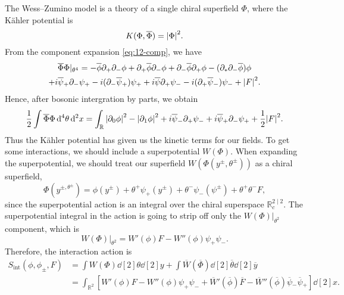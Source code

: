The Wess--Zumino model is a theory of a single chiral superfield $\Phi$, where the Kähler potential is 
\begin{equation}
  K(\Phi, \overline{\Phi}{}) = \abs{\Phi}^2.
\end{equation}
From the component expansion \eqref{eq:12-comp}, we have
\begin{multline}
  \overline{\Phi}{} \Phi\rvert_{\theta^4} = - \overline{\phi}{} \partial_+ \partial_- \phi + \partial_+ \overline{\phi}{} \partial_- \phi + \partial_- \overline{\phi}{} \partial_+ \phi - (\partial_* \partial_- \overline{\phi}{}) \phi \\
  + i \overline{\psi}{}_+ \partial_- \psi_+ - i (\partial_- \overline{\psi}{}_+) \psi_+ + i \overline{\psi}{} \partial_+ \psi_- - i (\partial_+ \overline{\psi}{}_-) \psi_- + \abs{F}^2.
\end{multline}
Hence, after bosonic intergration by parts, we obtain
\begin{equation}
  \frac{1}{2} \int \overline{\Phi}{} \Phi \dd[4]{\theta} \dd[2]{x} = \int_\mathbb{R} \abs{\partial_0 \phi}^2 - \abs{\partial_1 \phi}^2 + i \overline{\psi}{}_- \partial_+ \psi_- + i \overline{\psi}{}_+ \partial_- \psi_+ + \frac{1}{2} \abs{F}^2.
\end{equation}
Thus the Kähler potential has given us the kinetic terms for our fields. To get some interactions, we should include a superpotential $W(\Phi)$.
When expanding the superpotential, we should treat our superfield $W(\Phi (y^{\pm}, \theta^{\pm}))$ as a chiral superfield,
\begin{equation}
  \Phi(y^{\pm, \theta^{\pm}}) = \phi(y^{\pm}) + \theta^+ \psi_+ (y^{\pm}) + \theta^- \psi_- (\psi^{\pm}) + \theta ^+ \theta^- F,
\end{equation}
since the superpotential action is an integral over the chiral superspace $\mathbb{R}_c^{2 \mid 2}$.
The superpotential integral in the action is going to strip off only the $W(\Phi) \rvert_{\theta^2}$ component, which is
\begin{equation}
  W(\Phi) \rvert_{\theta^2} = W'(\phi) F - W'' (\phi) \psi_+ \psi_-.
\end{equation}
Therefore, the interaction action is
\begin{align}
  S_{\text{int}} (\phi, \phi_{\pm}, F) &= \int W(\Phi) \dd[2]{\theta} \dd[2]{y} + \int \overline{W} (\overline{\Phi}{}) \dd[2]{\overline{\theta}{}} \dd[2]{\overline{y}{}} \\
				       &= \int_{\mathbb{R}^2} \left[ W'(\phi) F - W''(\phi) \psi_+ \psi_- + \overline{W}{}' (\overline{\phi}{}) \overline{F}{} - \overline{W}{}'' (\overline{\phi}{}) \overline{\psi}{}_- \overline{\psi}{}_+ \right] \dd[2]{x}.
\end{align}
